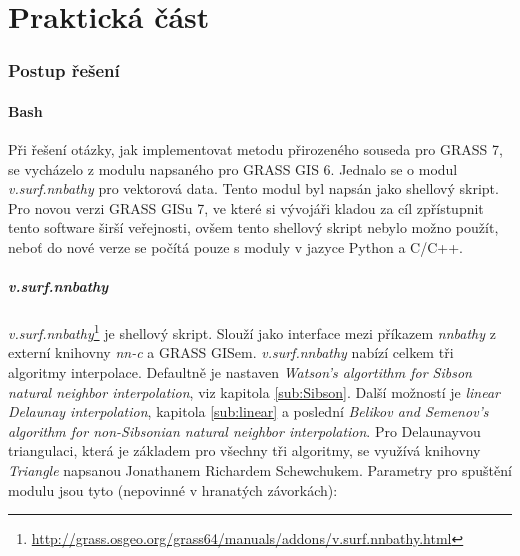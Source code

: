 \documentclass[12pt,a4paper]{article}
\begin{document}
\newpage	
\part{Praktická část}

\newpage
\section{Postup řešení}
\subsection{Bash}
\label{sub:Bash}

Při řešení otázky, jak implementovat metodu přirozeného souseda pro
GRASS 7, se vycházelo z modulu napsaného pro GRASS GIS 6. Jednalo se o
modul \emph{v.surf.nnbathy} pro vektorová data. Tento modul byl napsán
jako shellový skript. Pro novou verzi GRASS GISu 7, ve které si vývojáři kladou za
cíl zpřístupnit tento software širší veřejnosti, ovšem tento shellový skript nebylo možno použít, neboť do nové verze se počítá pouze s
moduly v jazyce Python a C/C++.

\subsubsection{v.surf.nnbathy}
\label{subsub:v.surf.nnbathy}
\emph{v.surf.nnbathy}\footnote{\url{http://grass.osgeo.org/grass64/manuals/addons/v.surf.nnbathy.html}}
je shellový skript. Slouží jako interface mezi příkazem \emph{nnbathy} z
externí knihovny \emph{nn-c} a GRASS GISem. \emph{v.surf.nnbathy}
nabízí celkem tři algoritmy interpolace. Defaultně je nastaven
\emph{Watson's algortithm for Sibson natural neighbor
  interpolation}, viz kapitola \ref{sub:Sibson}. Další možností je \emph{linear Delaunay
  interpolation}, kapitola \ref{sub:linear} a poslední \emph{Belikov and Semenov's algorithm for
  non-Sibsonian natural neighbor interpolation}. Pro Delaunayvou
triangulaci, která je základem pro všechny tři algoritmy, se využívá
knihovny \emph{Triangle} napsanou Jonathanem Richardem
Schewchukem. Parametry pro spuštění modulu jsou tyto (nepovinné v
hranatých závorkách):
\end{document}

